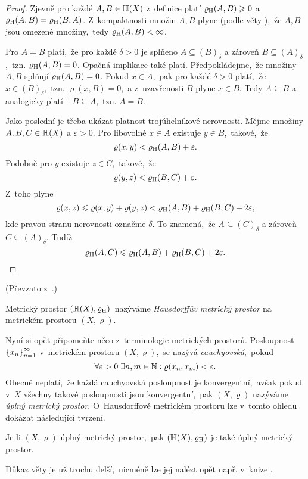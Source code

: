 \begin{proof}
    Zjevně pro každé $A,B\in\mathbb{H}(X)$ z~definice platí $\varrho_\textup{H}(A,B)\geqslant 0$ a $\varrho_\textup{H}(A,B)=\varrho_\textup{H}(B,A)$. Z~kompaktnosti množin $A,B$ plyne (podle věty ),~že $A,B$ jsou omezené množiny,~tedy $\varrho_\textup{H}(A,B)<\infty$.
    
    Pro $A=B$ platí,~že pro každé $\delta>0$ je splňeno $A\subseteq (B)_\delta$ a zároveň $B\subseteq (A)_\delta$,~tzn. $\varrho_\textup{H}(A,B)=0$. Opačná implikace také platí. Předpokládejme,~že množiny $A,B$ splňují $\varrho_\textup{H}(A,B)=0$. Pokud $x\in A$,~pak pro každé $\delta>0$ platí,~že $x\in (B)_\delta$,~tzn. $\varrho(x,B)=0$,~a z~uzavřenosti $B$ plyne $x\in B$. Tedy $A\subseteq B$ a analogicky platí i~$B\subseteq A$,~tzn. $A=B$.

    Jako poslední je třeba ukázat platnost trojúhelníkové nerovnosti. Mějme množiny $A,B,C\in\mathbb{H}(X)$ a $\varepsilon>0$. Pro libovolné $x\in A$ existuje $y\in B$,~takové,~že
    \[\varrho(x,y)<\varrho_\textup{H}(A,B)+\varepsilon.\]
    Podobně pro $y$ existuje $z\in C$,~takové,~že
    \[\varrho(y,z)<\varrho_\textup{H}(B,C)+\varepsilon.\]
    Z~toho plyne
    \[\varrho(x,z)\leqslant\varrho(x,y)+\varrho(y,z)<\varrho_\textup{H}(A,B)+\varrho_\textup{H}(B,C)+2\varepsilon,\]
    kde pravou stranu nerovnosti označme $\delta$. To znamená,~že $A\subseteq (C)_\delta$ a zároveň $C\subseteq (A)_\delta$. Tudíž
    \[\varrho_\textup{H}(A,C)\leqslant\varrho_\textup{H}(A,B)+\varrho_\textup{H}(B,C)+2\varepsilon.\]
\end{proof}
(Převzato z~\citep[str. 72]{Edgar2008}.)
\begin{definition}\label{def:hausdorffuv-mp}
    Metrický prostor $(\mathbb{H}(X),\varrho_\textup{H})$~nazýváme \emph{Hausdorffův metrický prostor} na metrickém prostoru $(X,\varrho)$.
\end{definition}
Nyní si opět připomeňte něco z~terminologie metrických prostorů. Posloupnost $\left\{x_n\right\}_{n=1}^\infty$ v~metrickém prostoru $(X,\varrho)$,~se nazývá \emph{cauchyovská},~pokud
\[\forall\varepsilon>0\;\exists n,m\in\mathbb{N}: \varrho(x_n,x_m)<\varepsilon.\]
Obecně neplatí,~že každá cauchyovská posloupnost je konvergentní,~avšak pokud v~$X$ všechny takové posloupnosti jsou konvergentní,~pak $(X,\varrho)$ nazýváme \emph{úplný metrický prostor}. O~Hausdorffově metrickém prostoru lze v~tomto ohledu dokázat následující tvrzení.
\begin{theorem}\label{thm:uplnost-hmp}
    Je-li $(X,\varrho)$ úplný metrický prostor,~pak $(\mathbb{H}(X),\varrho_\textup{H})$ je také úplný metrický prostor.
\end{theorem}
Důkaz věty je už trochu delší,~nicméně lze jej nalézt opět např. v~knize \citep[str. 72]{Edgar2008}.